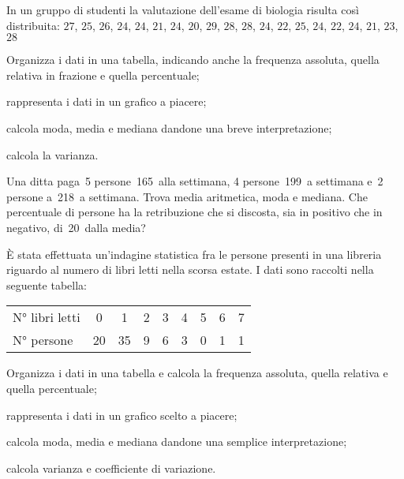 \begin{esercizio}
\label{ese:A.36}
In un gruppo di studenti la valutazione dell'esame di biologia risulta così 
distribuita:
$27$, $25$, $26$, $24$, $24$, $21$, $24$, $20$, $29$, $28$,
$28$, $24$, $22$, $25$, $24$, $22$, $24$, $21$, $23$, $28$
\begin{enumeratea}
 \item Organizza i dati in una tabella, indicando anche la frequenza 
assoluta, quella relativa in frazione e quella percentuale;
 \item rappresenta i dati in un grafico a piacere;
 \item calcola moda, media e mediana dandone una breve interpretazione;
 \item calcola la varianza.
\end{enumeratea}
\end{esercizio}

\begin{esercizio}
\label{ese:A.37}
Una ditta paga~5 persone~165\officialeuro\ alla settimana, 4 
persone~199\officialeuro\ a settimana e~2 persone a~218\officialeuro\ a 
settimana.
Trova media aritmetica, moda e mediana. Che percentuale di persone ha la 
retribuzione che si discosta,
sia in positivo che in negativo, di~20\officialeuro\ dalla media?
\end{esercizio}

\begin{esercizio}
\label{ese:A.38}
È stata effettuata un'indagine statistica fra le persone presenti in una 
libreria riguardo al numero di libri letti
nella scorsa estate. I dati sono raccolti nella seguente tabella:
\begin{center}
 \begin{tabular}{l*{8}{c}}
\toprule
N° libri letti & 0 & 1 & 2 & 3 & 4 & 5 & 6 & 7 \\
N° persone & 20 & 35 & 9 & 6 & 3 & 0 & 1 & 1 \\
\bottomrule
\end{tabular}
\end{center}
\begin{enumeratea}
 \item Organizza i dati in una tabella e calcola la frequenza assoluta, 
quella relativa e quella percentuale;
 \item rappresenta i dati in un grafico scelto a piacere;
 \item calcola moda, media e mediana dandone una semplice interpretazione;
 \item calcola varianza e coefficiente di variazione.
\end{enumeratea}
\end{esercizio}

